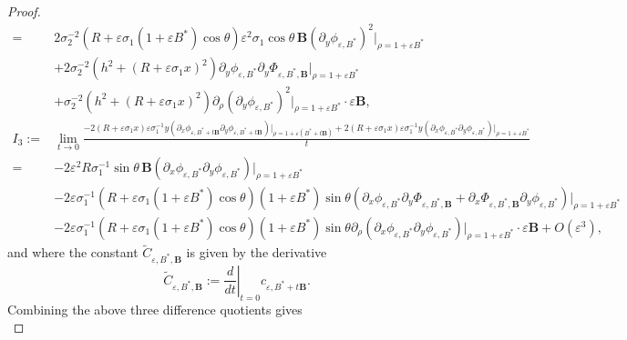 \documentclass[12pt,reqno]{amsart}
\numberwithin{equation}{section}
\theoremstyle{definition}
\theoremstyle{remark}
\begin{document}
\begin{proof}
\begin{align*}
= &  2\sigma_2^{-2}\left(R+\varepsilon \sigma_1\left(1+\varepsilon B^*\right) \cos \theta\right)  \varepsilon^2 \sigma_1 \cos \theta\, \textbf{B}\left(\partial_y \phi_{\varepsilon, B^*}\right)^2 \big|_{\rho=1+ \varepsilon B^*}\\
&+ 2\sigma_2^{-2}\left(h^2+\left(R+\varepsilon \sigma_1 x\right)^2\right)    \partial_y \phi_{\varepsilon,   B^*}   \partial_y \Phi_{\varepsilon, B^*, \textbf{B}}\big|_{\rho=1+\varepsilon B^*} \\
& +\sigma_2^{-2}\left(h^2+\left(R+\varepsilon \sigma_1 x\right)^2\right)   \partial_\rho\left(\partial_y \phi_{\varepsilon, B^*}\right)^2\big|_{\rho=1+\varepsilon B^*}\cdot \varepsilon \textbf{B},\\
I_3:=&\lim_{t\to0}\frac{-2(R+\varepsilon\sigma_1x)\varepsilon\sigma_1^{-1}y
	(\partial_x\phi_{\varepsilon,B^*+t  \textbf{B}}\partial_y\phi_{\varepsilon,B^*+t  \textbf{B}})\big|_{\rho=1+\varepsilon(B^*+t  \textbf{B})}  + 2(R+\varepsilon\sigma_1x)\varepsilon\sigma_1^{-1}y
	(\partial_x\phi_{\varepsilon,B^*}\partial_y\phi_{\varepsilon,B^*})\big|_{\rho=1+\varepsilon B^*}}{t}\\
=&- 2 \varepsilon^2 R \sigma_1^{-1} \sin \theta\, \textbf{B}  \left(\partial_x \phi_{\varepsilon, B^*}  \partial_y \phi_{\varepsilon, B^*}\right)\big|_{\rho=1+\varepsilon B^*}\\
&-2 \varepsilon \sigma_1^{-1}\left(R+\varepsilon \sigma_1\left(1+\varepsilon B^*\right) \cos \theta\right)\left(1+\varepsilon B^*\right) \sin \theta\left(\partial_x \phi_{\varepsilon, B^*} \partial_y \Phi_{\varepsilon, B^*, \textbf{B}}+\partial_x \Phi_{\varepsilon, B^*, \textbf{B}} \partial_y \phi_{\varepsilon, B^*}\right)\big|_{\rho=1+\varepsilon B^*}  \\
&-2 \varepsilon \sigma_1^{-1}\left(R+\varepsilon \sigma_1\left(1+\varepsilon B^*\right) \cos \theta\right)\left(1+\varepsilon B^*\right) \sin \theta   \partial_\rho\left(\partial_x \phi_{\varepsilon, B^*} \partial_y \phi_{\varepsilon, B^*}\right)\big|_{\rho=1+\varepsilon B^*} \cdot \varepsilon \textbf{B}+O\left(\varepsilon^3\right), 
\end{align*}
and where the constant $\widetilde C_{\varepsilon,B^*,\textbf{B}}$ is given by the derivative
\begin{equation*} 
\widetilde C_{\varepsilon,B^*,\textbf{B}}:=\left.\frac{d}{dt}\right|_{t=0}c_{\varepsilon,B^*+t \textbf{B}}.
\end{equation*}
Combining the above three difference quotients gives
\begin{equation}\label{eq:DBF}

\end{equation}
\end{proof}
\end{document}
